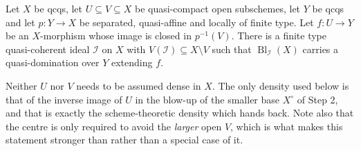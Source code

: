 \begin{lemma}
  \label{lemma:nagata-conrad-quasi-affine-general}
  \leanok

  Let $X$ be qcqs, let $U\subseteq V\subseteq X$ be quasi-compact open
  subschemes, let $Y$ be qcqs and let $p\colon Y\to X$ be separated,
  quasi-affine and locally of finite type.  Let $f\colon U\to Y$ be an
  $X$-morphism whose image is closed in $p^{-1}(V)$.  There is a finite type
  quasi-coherent ideal $\mathcal I$ on $X$ with
  $V(\mathcal I)\subseteq X\setminus V$ such that
  $\operatorname{Bl}_{\mathcal I}(X)$ carries a quasi-domination over $Y$
  extending $f$.

  Neither $U$ nor $V$ needs to be assumed dense in $X$.  The only density used
  below is that of the inverse image of $U$ in the blow-up of the smaller base
  $X^{\circ}$ of Step 2, and that is exactly the scheme-theoretic density which
   hands back.  Note also
  that the centre is only required to avoid the \emph{larger} open $V$, which
  is what makes this statement stronger than
   rather than a special
  case of it.
\end{lemma}


